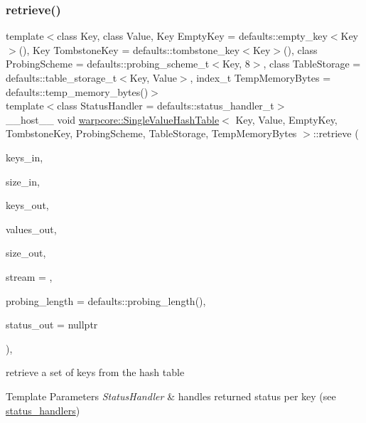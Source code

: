\subsubsection{\texorpdfstring{retrieve()}{retrieve()}\hspace{0.1cm}{\footnotesize\ttfamily [3/3]}}
{\footnotesize\ttfamily template$<$class Key, class Value, Key Empty\+Key = defaults\+::empty\+\_\+key$<$\+Key$>$(), Key Tombstone\+Key = defaults\+::tombstone\+\_\+key$<$\+Key$>$(), class Probing\+Scheme = defaults\+::probing\+\_\+scheme\+\_\+t$<$\+Key, 8$>$, class Table\+Storage = defaults\+::table\+\_\+storage\+\_\+t$<$\+Key, Value$>$, index\+\_\+t Temp\+Memory\+Bytes = defaults\+::temp\+\_\+memory\+\_\+bytes()$>$ \\
template$<$class Status\+Handler  = defaults\+::status\+\_\+handler\+\_\+t$>$ \\
\+\_\+\+\_\+host\+\_\+\+\_\+ void \hyperlink{classwarpcore_1_1SingleValueHashTable}{warpcore\+::\+Single\+Value\+Hash\+Table}$<$ Key, Value, Empty\+Key, Tombstone\+Key, Probing\+Scheme, Table\+Storage, Temp\+Memory\+Bytes $>$\+::retrieve (\begin{DoxyParamCaption}\item[{key\+\_\+type $\ast$}]{keys\+\_\+in,  }\item[{index\+\_\+type}]{size\+\_\+in,  }\item[{key\+\_\+type $\ast$}]{keys\+\_\+out,  }\item[{value\+\_\+type $\ast$}]{values\+\_\+out,  }\item[{index\+\_\+type \&}]{size\+\_\+out,  }\item[{cuda\+Stream\+\_\+t}]{stream = {},  }\item[{index\+\_\+type}]{probing\+\_\+length = {\ttfamily defaults\+:\+:probing\+\_\+length()},  }\item[{typename Status\+Handler\+::base\+\_\+type $\ast$}]{status\+\_\+out = {\ttfamily nullptr} }\end{DoxyParamCaption})\hspace{0.3cm}{\ttfamily [inline]}, {\ttfamily [noexcept]}}



retrieve a set of keys from the hash table 


\begin{DoxyTemplParams}{Template Parameters}
{\em Status\+Handler} & handles returned status per key (see {\ttfamily \hyperlink{namespacewarpcore_1_1status__handlers}{status\+\_\+handlers}}) \\
\hline
\end{DoxyTemplParams}

